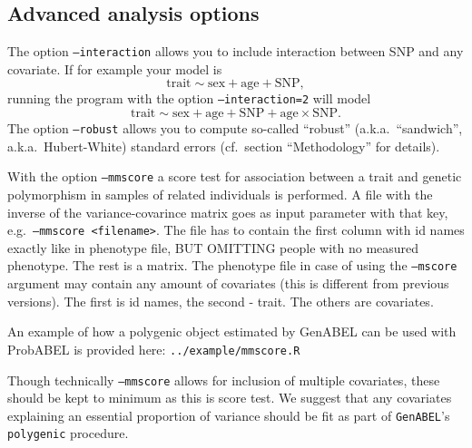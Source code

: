 \documentclass[12pt,a4paper]{article}
\begin{document}
\subsection{Advanced analysis options}
The option \texttt{--interaction} allows you to include interaction between SNP 
and any covariate. If for example your model is 
\begin{equation*}
  \textrm{trait} \sim \textrm{sex} + \textrm{age} + \textrm{SNP}, 
\end{equation*}
running the program with the option \texttt{--interaction=2} will model 
\begin{equation*}
  \textrm{trait} \sim \textrm{sex} + \textrm{age} + \textrm{SNP} +
  \textrm{age} \times \mathrm{SNP}.
\end{equation*}
The option \texttt{--robust} allows you to compute so-called
``robust'' (a.k.a.~``sandwich'', a.k.a.~Hubert-White) standard errors
(cf.~section ``Methodology'' for details).

With the option \texttt{--mmscore} a score test for association
between a trait and genetic polymorphism in samples of related
individuals is performed. A file with the inverse of the
variance-covarince matrix goes as input parameter with that key,
e.g.~\texttt{--mmscore <filename>}. The file has to contain the first
column with id names exactly like in phenotype file, BUT OMITTING
people with no measured phenotype. The rest is a matrix. The phenotype
file in case of using the \texttt{--mscore} argument may contain any
amount of covariates (this is different from previous versions). The
first is id names, the second - trait. The others are covariates.

An example of how a polygenic object estimated by GenABEL can be used
with ProbABEL is provided here: \texttt{../example/mmscore.R}

Though technically \texttt{--mmscore} allows for inclusion of multiple 
covariates, these should be kept to minimum as this is score test. We suggest 
that any covariates explaining an essential proportion of variance should be 
fit as part of \texttt{GenABEL}'s \texttt{polygenic} procedure.

\end{document}
